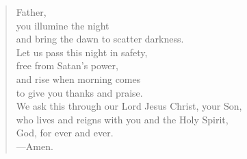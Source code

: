\prayer

\setlength{\leftmargini}{\prayerleftmargini}

\begin{verse}
Father,\\
you illumine the night\\
and bring the dawn to scatter darkness.\\
Let us pass this night in safety,\\
free from Satan’s power,\\
and rise when morning comes\\
to give you thanks and praise.\\
We ask this through our Lord Jesus Christ, your Son,\\
who lives and reigns with you and the Holy Spirit,\\
God, for ever and ever.\\
{\color{red}---\thinspace}Amen.
\end{verse}

\setlength{\leftmargini}{\defleftmargini}
